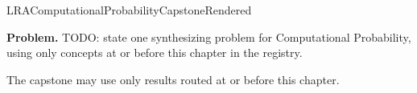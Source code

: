 \ifcsname LRAComputationalProbabilityCapstoneRendered\endcsname
\else
\expandafter\gdef\csname LRAComputationalProbabilityCapstoneRendered\endcsname{}

\newpage
{}
\label{cap:computational-probability}

\begin{tcolorbox}[
  colback=gray!6,
  colframe=gray!40,
  arc=2pt,
  left=8pt, right=8pt, top=6pt, bottom=6pt,
  title={\small\textbf{Capstone Problem}},
  fonttitle=\small\bfseries
]
\textbf{Problem.}
TODO: state one synthesizing problem for Computational Probability, using only concepts at or
before this chapter in the registry.
\end{tcolorbox}

\begin{remark*}
The capstone may use only results routed at or before this chapter.
\end{remark*}

\clearpage
\fi
